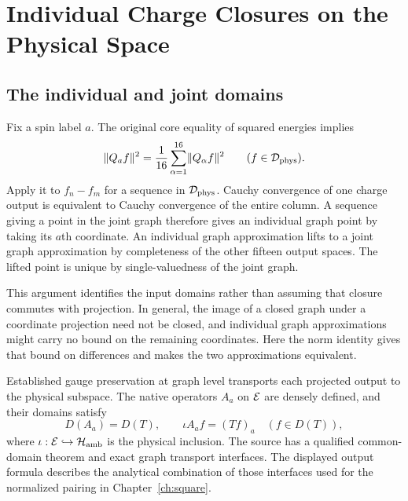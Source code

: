 \chapter{Individual Charge Closures on the Physical Space}\label{ch:charges}

\section{The individual and joint domains}
Fix a spin label $a$. The original core equality of squared energies implies
\[
 \lVert Q_a f\rVert^{2}=\frac1{16}\sum_{\alpha=1}^{16}\lVert Q_\alpha f\rVert^2
 \qquad (f\in\mathcal D_{\mathrm{phys}}).
\]
Apply it to $f_n-f_m$ for a sequence in $\mathcal D_{\mathrm{phys}}$. Cauchy convergence of one charge output is equivalent to Cauchy convergence of the entire column. A sequence giving a point in the joint graph therefore gives an individual graph point by taking its $a$th coordinate. An individual graph approximation lifts to a joint graph approximation by completeness of the other fifteen output spaces. The lifted point is unique by single-valuedness of the joint graph.

This argument identifies the input domains rather than assuming that closure commutes with projection. In general, the image of a closed graph under a coordinate projection need not be closed, and individual graph approximations might carry no bound on the remaining coordinates. Here the norm identity gives that bound on differences and makes the two approximations equivalent.

Established gauge preservation at graph level transports each projected output to the physical subspace. The native operators $A_a$ on $\mathcal E$ are densely defined, and their domains satisfy
\begin{equation}
 D(A_a)=D(T),\qquad
 \iota A_a f=(Tf)_a\quad(f\in D(T)),                 \label{eq:component}
\end{equation}
where $\iota:\mathcal E\hookrightarrow\mathcal H_{\mathrm{amb}}$ is the physical inclusion. The source has a qualified common-domain theorem and exact graph transport interfaces. The displayed output formula describes the analytical combination of those interfaces used for the normalized pairing in Chapter~\ref{ch:square}.

